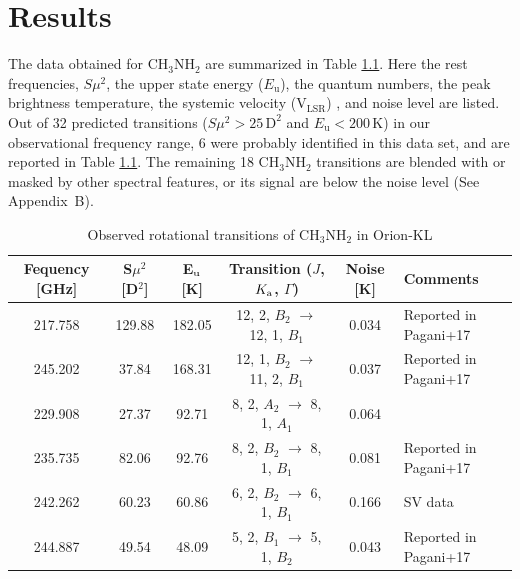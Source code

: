 \chapter{Results
  \label{chap:result}}

The data obtained for CH$_{3}$NH$_{2}$ are summarized in Table \ref{tab:MAOri}.
Here the rest frequencies, $S\mu^2$, the upper state energy ($E_{\mathrm{u}}$), the quantum numbers,
the peak brightness temperature, the systemic velocity (V$_{\mathrm{LSR}}$) , and noise level are listed.
Out of 32 predicted transitions ($S\mu^2 > 25\,\mathrm{D^2}$ and $E_{\mathrm{u}} < 200 \,\mathrm{K}$) 
in our observational frequency range, 6 were probably identified in this data set, and are reported in
Table \ref{tab:MAOri}. The remaining 18 CH$_{3}$NH$_{2}$ transitions are
blended with or masked by other spectral features, or its signal are below the noise level 
(See Appendix~B). 

\renewcommand{\arraystretch}{1.5}
\begin{table}[htb]
\begin{center}

  \caption{Observed rotational transitions of CH$_3$NH$_2$ in Orion-KL}
  \label{tab:MAOri}
{\scriptsize
  \begin{tabular}{cccccl} \hline
   Fequency [GHz]& S$\mu ^{2}$ [D$^2$] & E$_{\rm{u}}$ [K]& Transition ($J$, $K_{\rm{a}}$, $\Gamma$) & Noise [K]  &Comments \\ \hline 
    217.758 & 129.88 & 182.05 & 12, 2, $B_{2}$ $\rightarrow$ 12, 1, $B_{1}$ &  0.034 &Reported in Pagani+17 \\
    245.202 & 37.84 & 168.31 & 12, 1, $B_{2}$ $\rightarrow$ 11, 2, $B_{1}$ & 0.037 &Reported in Pagani+17 \\
    229.908 & 27.37 & 92.71 & 8, 2, $A_{2}$ $\rightarrow$ 8, 1, $A_{1}$ & 0.064&\\ 
    235.735 & 82.06 & 92.76 & 8, 2, $B_{2}$ $\rightarrow$ 8, 1, $B_{1}$ &  0.081 &Reported in Pagani+17 \\
    242.262 & 60.23 & 60.86 & 6, 2, $B_{2}$ $\rightarrow$ 6, 1, $B_{1}$ &  0.166 &SV data \\
    244.887 & 49.54 & 48.09 & 5, 2, $B_{1}$ $\rightarrow$ 5, 1, $B_{2}$ & 0.043 &Reported in Pagani+17 \\ \hline
  \end{tabular}
  }
\end{center}
\end{table}

